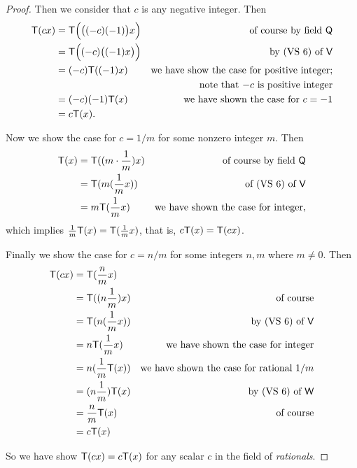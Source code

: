\begin{proof}
Then we consider that \(c\) is any negative integer.
Then
\begin{align*}
    \textsf{T}(cx) & = \textsf{T}\Big( \big( (-c)(-1) \big) x \Big) & \text{of course by field \(\textsf{Q}\)} \\
           & = \textsf{T}\Big( (-c) \big( (-1)x \big) \Big) & \text{by (VS 6) of \(\textsf{V}\)} \\
           & = (-c)\textsf{T}((-1)x) & \text{we have show the case for positive integer;} \\
           & & \text{note that \(-c\) is positive integer} \\
           & = (-c)(-1)\textsf{T}(x) & \text{we have shown the case for \(c = -1\)} \\
           & = c\textsf{T}(x).
\end{align*}

Now we show the case for \(c = 1/m\) for some nonzero integer \(m\).
Then
\begin{align*}
    \textsf{T}(x) & = \textsf{T}((m \cdot \frac{1}{m})x) & \text{of course by field \(\textsf{Q}\)} \\
          & = \textsf{T}(m(\frac{1}{m}x)) & \text{of (VS 6) of \(\textsf{V}\)} \\
          & = m\textsf{T}(\frac{1}{m}x) & \text{we have shown the case for integer},
\end{align*}
which implies \(\frac{1}{m} \textsf{T}(x) = \textsf{T}(\frac{1}{m}x)\), that is, \(c \textsf{T}(x) = \textsf{T}(c x)\).

Finally we show the case for \(c = n/m\) for some integers \(n, m\) where \(m \ne 0\).
Then
\begin{align*}
    \textsf{T}(cx) & = \textsf{T}(\frac{n}{m} x) \\
           & = \textsf{T}((n\frac{1}{m}) x) & \text{of course}\\
           & = \textsf{T}(n(\frac{1}{m}x)) & \text{by (VS 6) of \(\textsf{V}\)} \\
           & = n\textsf{T}(\frac{1}{m}x) & \text{we have shown the case for integer} \\
           & = n (\frac{1}{m}\textsf{T}(x)) & \text{we have shown the case for rational \(1/m\)} \\
           & = (n\frac{1}{m}) \textsf{T}(x) & \text{by (VS 6) of \(\textsf{W}\)} \\
           & = \frac{n}{m} \textsf{T}(x) & \text{of course} \\
           & = c \textsf{T}(x)
\end{align*}

So we have show \(\textsf{T}(cx) = c\textsf{T}(x)\) for any scalar \(c\) in the field of \emph{rationals}.
\end{proof}

